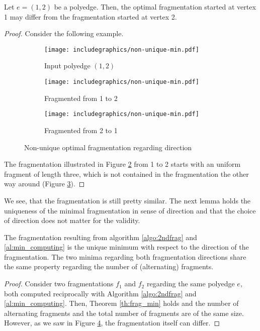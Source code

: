 \begin{lemma}
	Let $e = (1,2)$ be a polyedge. Then, the optimal fragmentation started at vertex 1 may differ from the fragmentation started at vertex 2.
\end{lemma}
\begin{proof}
	Consider the following example.
	\begin{figure}[H]
		\centering
		\begin{subfigure}{0.3\textwidth}
			\centering
			\texttt{[image: includegraphics/non-unique-min.pdf]}
			\caption{Input polyedge $(1,2)$}\label{im:non-unique-min1}
		\end{subfigure}
		\begin{subfigure}{0.3\textwidth}
			\centering
			\texttt{[image: includegraphics/non-unique-min.pdf]}
			\caption{Fragmented from 1 to 2}\label{im:non-unique-min2}
		\end{subfigure}
		\begin{subfigure}{0.3\textwidth}
			\centering
			\texttt{[image: includegraphics/non-unique-min.pdf]}
			\caption{Fragmented from 2 to 1}\label{im:non-unique-min3}
		\end{subfigure}
	\caption{Non-unique optimal fragmentation regarding direction}\label{im:non-unique-min}
	\end{figure}
The fragmentation illustrated in Figure \ref{im:non-unique-min2} from 1 to 2 starts with an uniform fragment of length three, which is not contained in the fragmentation the other way around (Figure \ref{im:non-unique-min3}).
\end{proof}
We see, that the fragmentation is still pretty similar. The next lemma holds the uniqueness of the minimal fragmentation in sense of direction and that the choice of direction does not matter for the validity.
\begin{lemma}
	The fragmentation resulting from algorithm \ref{algo:2ndfrag} and \ref{al:min_computing} is the unique minimum with respect to the direction of the fragmentation. The two minima regarding both fragmentation directions share the same property regarding the number of (alternating) fragments.
\end{lemma}
\begin{proof}
	Consider two fragmentations $f_1$ and $f_2$ regarding the same polyedge $e$, both computed reciprocally with Algorithm \ref{algo:2ndfrag} and \ref{al:min_computing}. Then, Theorem \ref{th:frag_min} holds and the number of alternating fragments and the total number of fragments are of the same size. However, as we saw in Figure \ref{im:non-unique-min}, the fragmentation itself can differ. 
\end{proof}
